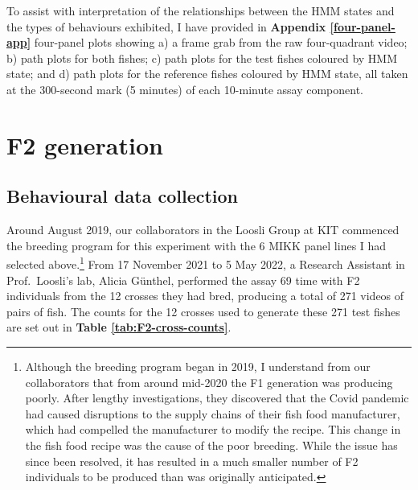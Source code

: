 \documentclass[
]{book}
\begin{document}
To assist with interpretation of the relationships between the HMM states and the types of behaviours exhibited, I have provided in \textbf{Appendix \ref{four-panel-app}} four-panel plots showing a) a frame grab from the raw four-quadrant video; b) path plots for both fishes; c) path plots for the test fishes coloured by HMM state; and d) path plots for the reference fishes coloured by HMM state, all taken at the 300-second mark (5 minutes) of each 10-minute assay component.

\hypertarget{f2-generation}{%
\section{F2 generation}\label{f2-generation}}

\hypertarget{behavioural-data-collection}{%
\subsection{Behavioural data collection}\label{behavioural-data-collection}}

Around August 2019, our collaborators in the Loosli Group at KIT commenced the breeding program for this experiment with the 6 MIKK panel lines I had selected above.\footnote{Although the breeding program began in 2019, I understand from our collaborators that from around mid-2020 the F1 generation was producing poorly. After lengthy investigations, they discovered that the Covid pandemic had caused disruptions to the supply chains of their fish food manufacturer, which had compelled the manufacturer to modify the recipe. This change in the fish food recipe was the cause of the poor breeding. While the issue has since been resolved, it has resulted in a much smaller number of F2 individuals to be produced than was originally anticipated.} From 17 November 2021 to 5 May 2022, a Research Assistant in Prof.~Loosli's lab, Alicia Günthel, performed the assay 69 time with F2 individuals from the 12 crosses they had bred, producing a total of 271 videos of pairs of fish. The counts for the 12 crosses used to generate these 271 test fishes are set out in \textbf{Table \ref{tab:F2-cross-counts}}.
\end{document}
